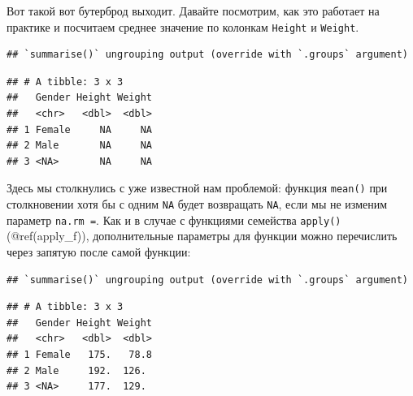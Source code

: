 \documentclass[
]{book}
\newenvironment{Shaded}{\begin{snugshade}}{\end{snugshade}}
\newcommand{\DataTypeTok}[1]{\textcolor[rgb]{0.13,0.29,0.53}{#1}}
\newcommand{\KeywordTok}[1]{\textcolor[rgb]{0.13,0.29,0.53}{\textbf{#1}}}
\newcommand{\NormalTok}[1]{#1}
\newcommand{\OperatorTok}[1]{\textcolor[rgb]{0.81,0.36,0.00}{\textbf{#1}}}
\newcommand{\OtherTok}[1]{\textcolor[rgb]{0.56,0.35,0.01}{#1}}
\newcommand{\StringTok}[1]{\textcolor[rgb]{0.31,0.60,0.02}{#1}}
\begin{document}
Вот такой вот бутерброд выходит. Давайте посмотрим, как это работает на практике и посчитаем среднее значение по колонкам \texttt{Height} и \texttt{Weight}.

\begin{Shaded}
\end{Shaded}

\begin{verbatim}
## `summarise()` ungrouping output (override with `.groups` argument)
\end{verbatim}

\begin{verbatim}
## # A tibble: 3 x 3
##   Gender Height Weight
##   <chr>   <dbl>  <dbl>
## 1 Female     NA     NA
## 2 Male       NA     NA
## 3 <NA>       NA     NA
\end{verbatim}

Здесь мы столкнулись с уже известной нам проблемой: функция \texttt{mean()} при столкновении хотя бы с одним \texttt{NA} будет возвращать \texttt{NA}, если мы не изменим параметр \texttt{na.rm\ =}. Как и в случае с функциями семейства \texttt{apply()} (@ref(apply\_f)), дополнительные параметры для функции можно перечислить через запятую после самой функции:

\begin{Shaded}
\end{Shaded}

\begin{verbatim}
## `summarise()` ungrouping output (override with `.groups` argument)
\end{verbatim}

\begin{verbatim}
## # A tibble: 3 x 3
##   Gender Height Weight
##   <chr>   <dbl>  <dbl>
## 1 Female   175.   78.8
## 2 Male     192.  126. 
## 3 <NA>     177.  129.
\end{verbatim}
\end{document}
